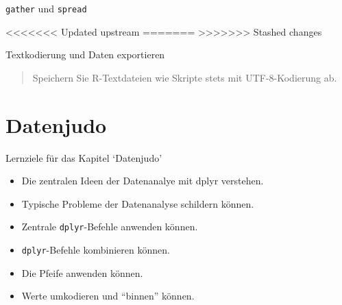 \begin{frame}[fragile]{\texttt{gather} und \texttt{spread}}

\begin{Shaded}
\begin{Highlighting}[]
\StringTok{ } \NormalTok{, } \NormalTok{)}

\StringTok{ }

<<<<<<< Updated upstream
\StringTok{ } \NormalTok{, } \NormalTok{, }\OperatorTok{-}
=======
\StringTok{ } \NormalTok{, } 
>>>>>>> Stashed changes
\end{Highlighting}
\end{Shaded}

\end{frame}

\begin{frame}[fragile]{Textkodierung und Daten exportieren}

\begin{quote}
Speichern Sie R-Textdateien wie Skripte stets mit UTF-8-Kodierung ab.
\end{quote}

\begin{Shaded}
\begin{Highlighting}[]
\NormalTok{)}
\end{Highlighting}
\end{Shaded}

\end{frame}

\section{Datenjudo}\label{datenjudo}

\begin{frame}[fragile]{Lernziele für das Kapitel `Datenjudo'}

\begin{itemize}
\tightlist
\item
  Die zentralen Ideen der Datenanalye mit dplyr verstehen.
\item
  Typische Probleme der Datenanalyse schildern können.
\item
  Zentrale \texttt{dplyr}-Befehle anwenden können.
\item
  \texttt{dplyr}-Befehle kombinieren können.
\item
  Die Pfeife anwenden können.
\item
  Werte umkodieren und ``binnen'' können.
\end{itemize}

\end{frame}

